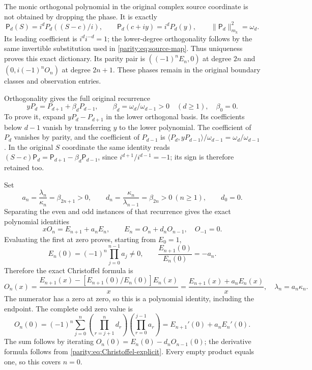\documentclass[11pt]{article}
\begin{document}
The monic orthogonal polynomial in the original complex source
coordinate is not obtained by dropping the phase. It is exactly
\begin{equation}\label{parity:eq:S-polynomial-phase}
 \mathsf P_d(S)=i^dP_d((S-c)/i),\qquad
 \mathsf P_d(c+iy)=i^dP_d(y),\qquad
 \|\mathsf P_d\|_{m_k}^2=\omega_d.
\end{equation}
Its leading coefficient is $i^di^{-d}=1$; the lower-degree
orthogonality follows by the same invertible substitution used
in \eqref{parity:eq:source-map}. Thus uniqueness proves this exact
dictionary. Its parity pair is $((-1)^nE_n,0)$ at degree $2n$
and $(0,i(-1)^nO_n)$ at degree $2n+1$. These phases remain in
the original boundary classes and observation entries.

Orthogonality gives the full original recurrence
\[
 yP_d=P_{d+1}+\beta_dP_{d-1},\qquad
 \beta_d=\omega_d/\omega_{d-1}>0\quad(d\geq1),\quad \beta_0=0.
\]
To prove it, expand $yP_d-P_{d+1}$ in the lower orthogonal basis.
Its coefficients below $d-1$ vanish by transferring $y$ to the
lower polynomial. The coefficient of $P_d$ vanishes by parity,
and the coefficient of $P_{d-1}$ is
$\langle P_d,yP_{d-1}\rangle/\omega_{d-1}=\omega_d/\omega_{d-1}$.
In the original $S$ coordinate the same identity reads
$(S-c)\mathsf P_d=\mathsf P_{d+1}-\beta_d\mathsf P_{d-1}$,
since $i^{d+1}/i^{d-1}=-1$; its sign is therefore retained too.

Set
\begin{equation}\label{parity:eq:ad}
 a_n=\frac{\lambda_n}{\kappa_n}=\beta_{2n+1}>0,
 \qquad d_n=\frac{\kappa_n}{\lambda_{n-1}}=\beta_{2n}>0\ (n\geq1),
 \qquad d_0=0.
\end{equation}
Separating the even and odd instances of that recurrence gives
the exact polynomial identities
\begin{equation}\label{parity:eq:Christoffel}
 xO_n=E_{n+1}+a_nE_n,\qquad
 E_n=O_n+d_nO_{n-1},\quad O_{-1}=0.
\end{equation}
Evaluating the first at zero proves, starting from $E_0=1$,
\begin{equation}\label{parity:eq:E0}
 E_n(0)=(-1)^n\prod_{j=0}^{n-1}a_j\ne0,
 \qquad \frac{E_{n+1}(0)}{E_n(0)}=-a_n.
\end{equation}
Therefore the exact Christoffel formula is
\begin{equation}\label{parity:eq:Christoffel-explicit}
 O_n(x)=\frac{E_{n+1}(x)-[E_{n+1}(0)/E_n(0)]E_n(x)}x
        =\frac{E_{n+1}(x)+a_nE_n(x)}x,
 \quad \lambda_n=a_n\kappa_n.
\end{equation}
The numerator has a zero at zero, so this is a polynomial identity,
including the endpoint. The complete odd zero value is
\begin{equation}\label{parity:eq:O0}
 O_n(0)=(-1)^n\sum_{j=0}^n
     \left(\prod_{r=j+1}^nd_r\right)
     \left(\prod_{r=0}^{j-1}a_r\right)
 =E_{n+1}'(0)+a_nE_n'(0).
\end{equation}
The sum follows by iterating $O_n(0)=E_n(0)-d_nO_{n-1}(0)$;
the derivative formula follows from \eqref{parity:eq:Christoffel-explicit}.
Every empty product equals one, so this covers $n=0$.
\end{document}
